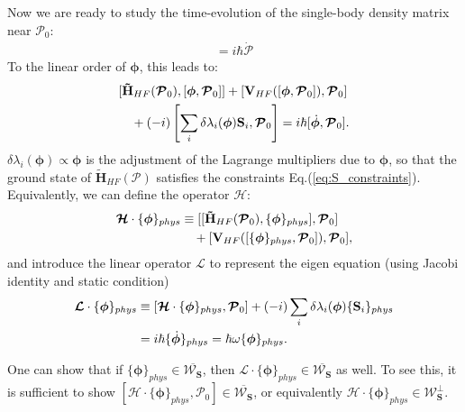 \begin{subappendices}
    Now we are ready to study the time-evolution of the single-body density matrix near $\boldsymbol{\mathcal P}_0$:
    \begin{align}
        [\mathbf{\tilde H}_{HF}(\boldsymbol{\mathcal P}), \boldsymbol{\mathcal P}]=i\hbar\dot{\boldsymbol{\mathcal P}}
    \end{align}
    To the linear order of $\boldsymbol\phi$, this leads to:
    \begin{align}
         & [\mathbf {\tilde H}_{HF}(\boldsymbol{\mathcal P}_0),[\boldsymbol\phi,\boldsymbol{\mathcal P}_0]]+[\mathbf V_{HF}([\boldsymbol\phi,\boldsymbol{\mathcal P}_0]),\boldsymbol{\mathcal P}_0]\notag \\
         & \quad+(-i)\left[\sum_i\delta\lambda_i(\boldsymbol\phi) \mathbf S_i,\boldsymbol{\mathcal P}_0\right]=i\hbar [\dot{\boldsymbol\phi},\boldsymbol{\mathcal P}_0].
    \end{align}
    $\delta\lambda_i(\boldsymbol\phi)\propto \boldsymbol\phi$ is the adjustment of the Lagrange multipliers due to $\boldsymbol\phi$, so that the ground state of $\mathbf{\tilde H}_{HF}(\boldsymbol{\mathcal P})$ satisfies the constraints Eq.(\ref{eq:S_constraints}).
    Equivalently, we can define the operator $\boldsymbol{\mathcal H}$:
    \begin{align}
        \boldsymbol{\mathcal H} \cdot \{\boldsymbol\phi\}_{phys} & \equiv [[\mathbf {\tilde H}_{HF}(\boldsymbol{\mathcal P}_0),\{\boldsymbol\phi\}_{phys}],\boldsymbol{\mathcal P}_0]\notag     \\
                                                                 & \quad+[\mathbf V_{HF}([\{\boldsymbol\phi\}_{phys},\boldsymbol{\mathcal P}_0]),\boldsymbol{\mathcal P}_0], \label{eq:H_eigen}
    \end{align}
    and introduce the linear operator $\boldsymbol{\mathcal L}$ to represent the eigen equation (using Jacobi identity and static condition)
    \begin{align}
        \boldsymbol{\mathcal L}\cdot \{\boldsymbol\phi\}_{phys} & \equiv [\boldsymbol{\mathcal H} \cdot \{\boldsymbol\phi\}_{phys},\boldsymbol{\mathcal P}_0]+(-i)\sum_i\delta\lambda_i(\boldsymbol\phi) \{\mathbf S_i\}_{phys}\notag \\
                                                                & =i\hbar\{\dot{\boldsymbol\phi}\}_{phys}=\hbar\omega\{\boldsymbol\phi\}_{phys} .\label{eq:L_eigen}
    \end{align}

    One can show that if $\{\boldsymbol\phi\}_{phys}\in \overline{\boldsymbol{\mathcal W}_{\mathbf S}}$, then $\boldsymbol{\mathcal L}\cdot \{\boldsymbol\phi\}_{phys}\in \overline{\boldsymbol{\mathcal W}_{\mathbf S}}$ as well. To see this, it is sufficient to show $[\boldsymbol{\mathcal H} \cdot \{\boldsymbol\phi\}_{phys},\boldsymbol{\mathcal P}_0]\in \overline{\boldsymbol{\mathcal W}_{\mathbf S}}$, or equivalently $\boldsymbol{\mathcal H} \cdot \{\boldsymbol\phi\}_{phys}\in \boldsymbol{\mathcal W}_{\mathbf S}^{\perp}$.


\end{subappendices}
